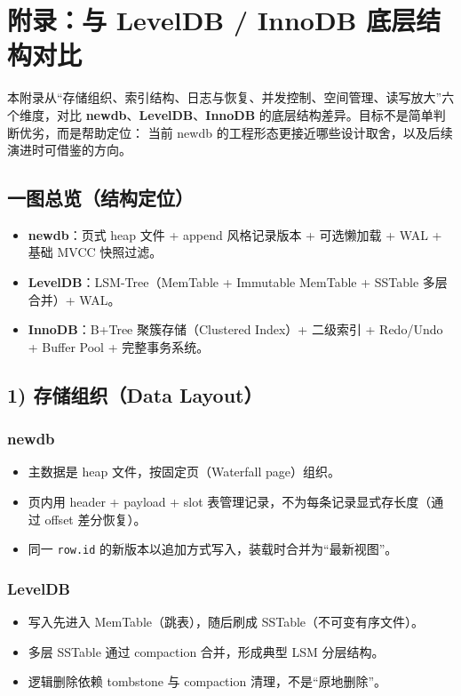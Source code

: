 \section{附录：与 LevelDB / InnoDB 底层结构对比}

本附录从“存储组织、索引结构、日志与恢复、并发控制、空间管理、读写放大”六个维度，对比
\textbf{newdb}、\textbf{LevelDB}、\textbf{InnoDB} 的底层结构差异。目标不是简单判断优劣，而是帮助定位：
当前 newdb 的工程形态更接近哪些设计取舍，以及后续演进时可借鉴的方向。

\subsection{一图总览（结构定位）}

\begin{itemize}
  \item \textbf{newdb}：页式 heap 文件 + append 风格记录版本 + 可选懒加载 + WAL + 基础 MVCC 快照过滤。
  \item \textbf{LevelDB}：LSM-Tree（MemTable + Immutable MemTable + SSTable 多层合并）+ WAL。
  \item \textbf{InnoDB}：B+Tree 聚簇存储（Clustered Index）+ 二级索引 + Redo/Undo + Buffer Pool + 完整事务系统。
\end{itemize}

\subsection{1) 存储组织（Data Layout）}

\subsubsection{newdb}
\begin{itemize}
  \item 主数据是  heap 文件，按固定页（Waterfall page）组织。
  \item 页内用 header + payload + slot 表管理记录，不为每条记录显式存长度（通过 offset 差分恢复）。
  \item 同一 \texttt{row.id} 的新版本以追加方式写入，装载时合并为“最新视图”。
\end{itemize}

\subsubsection{LevelDB}
\begin{itemize}
  \item 写入先进入 MemTable（跳表），随后刷成 SSTable（不可变有序文件）。
  \item 多层 SSTable 通过 compaction 合并，形成典型 LSM 分层结构。
  \item 逻辑删除依赖 tombstone 与 compaction 清理，不是“原地删除”。
\end{itemize}

